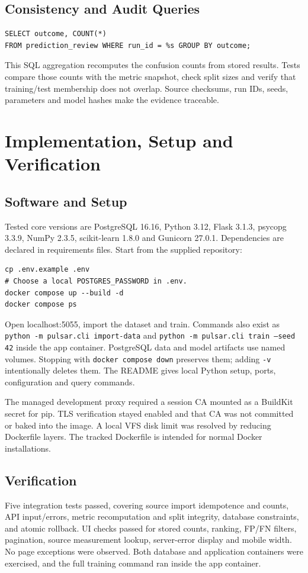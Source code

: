 \documentclass[11pt,a4paper]{article}
\begin{document}
\subsection{Consistency and Audit Queries}
\begin{verbatim}
SELECT outcome, COUNT(*)
FROM prediction_review WHERE run_id = %s GROUP BY outcome;
\end{verbatim}
This SQL aggregation recomputes the confusion counts from stored results. Tests compare those counts with the metric snapshot, check split sizes and verify that training/test membership does not overlap. Source checksums, run IDs, seeds, parameters and model hashes make the evidence traceable.

\newpage
\section{Implementation, Setup and Verification}
\subsection{Software and Setup}
Tested core versions are PostgreSQL 16.16, Python 3.12, Flask 3.1.3, psycopg 3.3.9, NumPy 2.3.5, scikit-learn 1.8.0 and Gunicorn 27.0.1. Dependencies are declared in requirements files. Start from the supplied repository:
\begin{verbatim}
cp .env.example .env
# Choose a local POSTGRES_PASSWORD in .env.
docker compose up --build -d
docker compose ps
\end{verbatim}
Open localhost:5055, import the dataset and train. Commands also exist as \texttt{python -m pulsar.cli import-data} and \texttt{python -m pulsar.cli train --seed 42} inside the app container. PostgreSQL data and model artifacts use named volumes. Stopping with \texttt{docker compose down} preserves them; adding \texttt{-v} intentionally deletes them. The README gives local Python setup, ports, configuration and query commands.

The managed development proxy required a session CA mounted as a BuildKit secret for pip. TLS verification stayed enabled and that CA was not committed or baked into the image. A local VFS disk limit was resolved by reducing Dockerfile layers. The tracked Dockerfile is intended for normal Docker installations.

\subsection{Verification}
Five integration tests passed, covering source import idempotence and counts, API input/errors, metric recomputation and split integrity, database constraints, and atomic rollback. UI checks passed for stored counts, ranking, FP/FN filters, pagination, source measurement lookup, server-error display and mobile width. No page exceptions were observed. Both database and application containers were exercised, and the full training command ran inside the app container.
\end{document}
